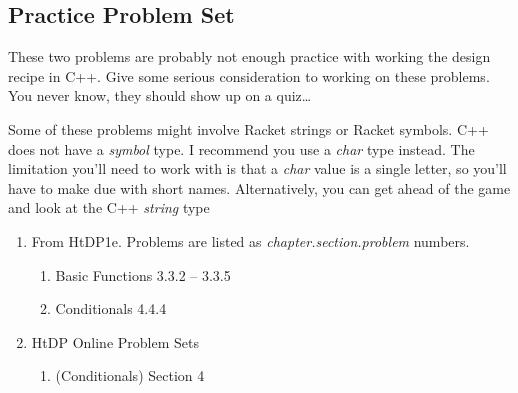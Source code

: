 \documentclass[nobib]{tufte-handout}
\begin{document}
\newpage

\subsection{Practice Problem Set}

These two problems are probably not enough practice with working the design recipe in C++.  Give some serious consideration to working on these problems. You never know, they should show up on a quiz\ldots

Some of these problems might involve Racket strings or Racket symbols. C++ does not have a \textit{symbol} type.  I recommend you use a \textit{char} type instead.  The limitation you'll need to work with is that a \textit{char} value is a single letter, so you'll have to make due with short names.  Alternatively, you can get ahead of the game and look at the C++ \textit{string} type
\begin{enumerate}
\item From HtDP1e. Problems are listed as \textit{chapter.section.problem} numbers.
\begin{enumerate}
\item Basic Functions 3.3.2 -- 3.3.5
\item Conditionals 4.4.4
\end{enumerate}
\item HtDP Online Problem Sets
\begin{enumerate}
\item (Conditionals) Section 4
\end{enumerate}
\end{enumerate}
\end{document}

